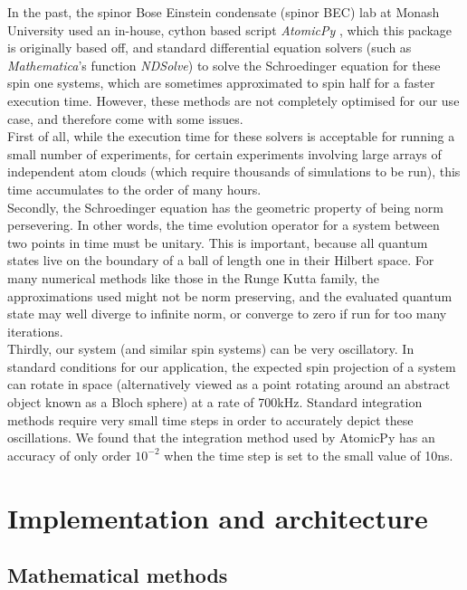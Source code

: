 \documentclass{jors}
\begin{document}
	In the past, the spinor Bose Einstein condensate (spinor BEC) lab at Monash University used an in-house, cython based script \emph{AtomicPy} \cite{morris_qcmonkatomicpy_2018}, which this package is originally based off, and standard differential equation solvers (such as \emph{Mathematica}'s function \emph{NDSolve}) to solve the Schroedinger equation for these spin one systems, which are sometimes approximated to spin half for a faster execution time. However, these methods are not completely optimised for our use case, and therefore come with some issues.\\

	First of all, while the execution time for these solvers is acceptable for running a small number of experiments, for certain experiments involving large arrays of independent atom clouds (which require thousands of simulations to be run), this time accumulates to the order of many hours.\\

	Secondly, the Schroedinger equation has the geometric property of being norm persevering. In other words, the time evolution operator for a system between two points in time must be unitary. This is important, because all quantum states live on the boundary of a ball of length one in their Hilbert space. For many numerical methods like those in the Runge Kutta family, the approximations used might not be norm preserving, and the evaluated quantum state may well diverge to infinite norm, or converge to zero if run for too many iterations.\\

	Thirdly, our system (and similar spin systems) can be very oscillatory. In standard conditions for our application, the expected spin projection of a system can rotate in space (alternatively viewed as a point rotating around an abstract object known as a Bloch sphere) at a rate of 700kHz. Standard integration methods require very small time steps in order to accurately depict these oscillations. We found that the integration method used by AtomicPy has an accuracy of only order \(10^{-2}\) when the time step is set to the small value of 10ns.

\section*{Implementation and architecture}
	\subsection*{Mathematical methods}
\end{document}
